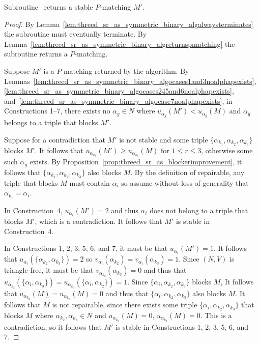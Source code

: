 \begin{lem}
\label{lem:threed_sr_as_symmetric_binary_algoreturnsstablematching_notimecomplex}
Subroutine~ returns a stable $P$\nobreakdash-matching $M'$.
\end{lem}
\begin{proof}
By Lemma~\ref{lem:threed_sr_as_symmetric_binary_algalwaysterminates} the subroutine must eventually terminate. By Lemma~\ref{lem:threed_sr_as_symmetric_binary_algreturnspmatching} the subroutine returns a $P$\nobreakdash-matching.

Suppose $M'$ is a $P$\nobreakdash-matching returned by the algorithm. By Lemmas~\ref{lem:threed_sr_as_symmetric_binary_algocases1and3noalphapexists}, \ref{lem:threed_sr_as_symmetric_binary_algocases245and6noalphapexists}, and~\ref{lem:threed_sr_as_symmetric_binary_algocase7noalphapexists}, in Constructions 1--7, there exists no $\alpha_g \in N$ where $u_{\alpha_{g}}(M') < u_{\alpha_{g}}(M)$ and $\alpha_g$ belongs to a triple that blocks $M'$.

Suppose for a contradiction that $M'$ is not stable and some triple $\{ \alpha_{k_1}, \alpha_{k_2},\allowbreak \alpha_{k_3} \}$ blocks $M'$. It follows that $u_{\alpha_{k_r}}(M') \geq u_{\alpha_{k_r}}(M)$ for $1 \leq r \leq 3$, otherwise some such $\alpha_g$ exists. By Proposition~\ref{prop:threed_sr_as_blockerimprovement}, it follows that $\{ \alpha_{k_1}, \alpha_{k_2}, \alpha_{k_3} \}$ also blocks $M$. By the definition of repairable, any triple that blocks $M$ must contain $\alpha_i$ so assume without loss of generality that $\alpha_{k_1}=\alpha_i$.

In Construction~4, $u_{\alpha_i}(M')=2$ and thus $\alpha_i$ does not belong to a triple that blocks $M'$, which is a contradiction. It follows that $M'$ is stable in Construction~4.

In Constructions 1, 2, 3, 5, 6, and 7, it must be that $u_{\alpha_i}(M')=1$. It follows that $u_{\alpha_i}(\{ \alpha_{k_2}, \alpha_{k_3} \})=2$ so $v_{\alpha_i}(\alpha_{k_2})=v_{\alpha_i}(\alpha_{k_3})=1$. Since $(N, V)$ is triangle-free, it must be that $v_{\alpha_{k_2}}(\alpha_{k_3})=0$ and thus that $u_{\alpha_{k_2}}(\{ \alpha_{i}, \alpha_{k_3} \})=u_{\alpha_{k_3}}(\{ \alpha_{i}, \alpha_{k_2} \})=1$. Since $\{ \alpha_{i}, \alpha_{k_2}, \alpha_{k_3} \}$ blocks $M$, It follows that $u_{\alpha_{k_2}}(M)=u_{\alpha_{k_3}}(M)=0$ and thus that $\{ \alpha_i, \alpha_{k_2}, \alpha_{k_3} \}$ also blocks $M$. It follows that $M$ is not repairable, since there exists some triple $\{ \alpha_i, \alpha_{k_2}, \alpha_{k_3} \}$ that blocks $M$ where $\alpha_{k_2}, \alpha_{k_3}\in N$ and $u_{\alpha_{k_2}}(M)=0$, $u_{\alpha_{k_3}}(M)=0$. This is a contradiction, so it follows that $M'$ is stable in Constructions 1, 2, 3, 5, 6, and 7.
\end{proof}

